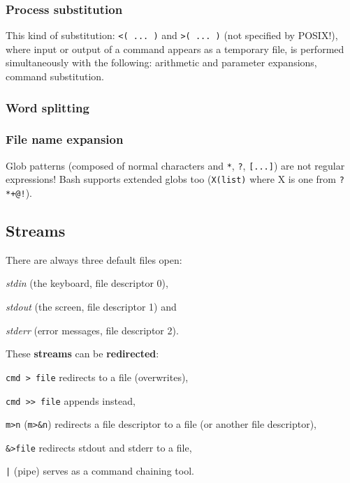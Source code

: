 \subsubsection{Process substitution}
This kind of substitution: \texttt{<( ... )} and \texttt{>( ... )} (not specified by POSIX!), where input or output of a command appears as a temporary file, is performed simultaneously with the following: arithmetic and parameter expansions, command substitution.

\subsubsection{Word splitting}

\subsubsection{File name expansion}
Glob patterns (composed of normal characters and \texttt{*}, \texttt{?}, \texttt{[...]}) are not regular expressions!
Bash supports extended globs too (\texttt{X(list)} where X is one from \texttt{?*+@!}).

\subsection{Streams}
There are always three default files open:
\begin{compactenum}
\item \emph{stdin} (the keyboard, file descriptor 0),
\item \emph{stdout} (the screen, file descriptor 1) and
\item \emph{stderr} (error messages, file descriptor 2).
\end{compactenum}

These \textbf{streams} can be \textbf{redirected}:
\begin{compactenum}
\item \texttt{cmd > file} redirects to a file (overwrites),
\item \texttt{cmd >> file} appends instead,
\item \texttt{m>n} (\texttt{m>&n}) redirects a file descriptor to a file
(or another file descriptor),
\item \texttt{&>file} redirects stdout and stderr to a file,
\item \texttt{|} (pipe) serves as a command chaining tool.
\end{compactenum}

